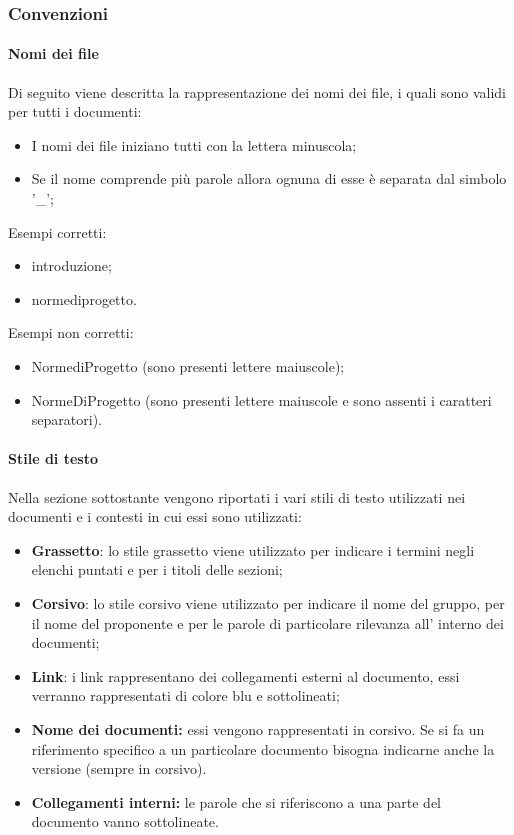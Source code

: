 \subsubsection{Convenzioni}
\paragraph{Nomi dei file}
Di seguito viene descritta la rappresentazione dei nomi dei file, i quali sono validi per tutti i documenti:
\begin{itemize}
    \item I nomi dei file iniziano tutti con la lettera minuscola;
    \item Se il nome comprende più parole allora ognuna di esse è separata dal simbolo '\_';
\end {itemize}
Esempi corretti:
\begin{itemize}
    \item introduzione;
    \item norme\textunderscore di\textunderscore progetto.
\end {itemize}
Esempi non corretti:
\begin{itemize}
    \item Norme\textunderscore di\textunderscore Progetto (sono presenti lettere maiuscole);
    \item NormeDiProgetto (sono presenti lettere maiuscole e sono assenti i caratteri separatori).
\end {itemize}

\paragraph{Stile di testo}
Nella sezione sottostante vengono riportati i vari stili di testo utilizzati nei documenti e i contesti in cui essi sono utilizzati:
\begin {itemize}
    \item \textbf{Grassetto}: lo stile grassetto viene utilizzato per indicare i termini negli elenchi puntati e per i titoli delle sezioni;
    \item \textbf{Corsivo}: lo stile corsivo viene utilizzato per indicare il nome del gruppo, per il nome del proponente e per le parole di particolare rilevanza all' interno dei documenti;
    \item \textbf{Link}: i link rappresentano dei collegamenti esterni al documento, essi verranno rappresentati di colore blu e sottolineati;
    \item \textbf{Nome dei documenti:} essi vengono rappresentati in corsivo. Se si fa un riferimento specifico a un particolare documento bisogna indicarne anche la versione (sempre in corsivo).
    \item \textbf{Collegamenti interni:} le parole che si riferiscono a una parte del documento vanno sottolineate.
\end {itemize}
